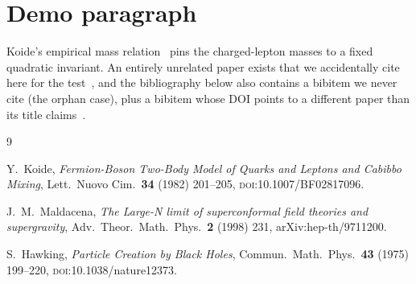 \documentclass{article}
\begin{document}
\section*{Demo paragraph}

Koide's empirical mass relation~\cite{koide1982} pins the charged-lepton
masses to a fixed quadratic invariant.  An entirely unrelated paper exists
that we accidentally cite here for the test~\cite{nonexistent_key}, and
the bibliography below also contains a bibitem we never cite (the orphan
case), plus a bibitem whose DOI points to a different paper than its title
claims~\cite{wrong_doi}.

\begin{thebibliography}{9}

Y.~Koide, \emph{Fermion-Boson Two-Body Model of Quarks and Leptons and
Cabibbo Mixing}, Lett.\ Nuovo Cim.\ \textbf{34} (1982) 201--205,
\textsc{doi}:10.1007/BF02817096.

J.~M.~Maldacena, \emph{The Large-N limit of superconformal field theories
and supergravity}, Adv.\ Theor.\ Math.\ Phys.\ \textbf{2} (1998) 231,
arXiv:hep-th/9711200.

S.~Hawking, \emph{Particle Creation by Black Holes}, Commun.\ Math.\ Phys.\
\textbf{43} (1975) 199--220, \textsc{doi}:10.1038/nature12373.

\end{thebibliography}
\end{document}
